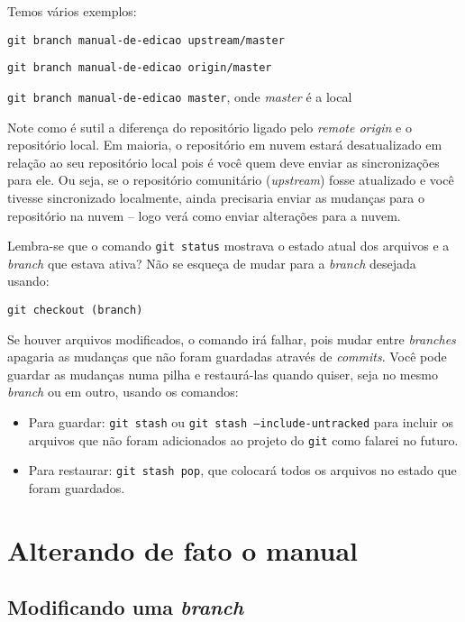 \documentclass[a4paper,oneside,10pt]{memoir}
\begin{document}
Temos vários exemplos:

\begin{center}
\texttt{git branch manual-de-edicao upstream/master}

\texttt{git branch manual-de-edicao origin/master}

\texttt{git branch manual-de-edicao master}, onde \emph{master} é a local
\end{center}

Note como é sutil a diferença do repositório ligado pelo \emph{remote origin} e
o repositório local. Em maioria, o repositório em nuvem estará desatualizado em
relação ao seu repositório local pois é você quem deve enviar as sincronizações
para ele. Ou seja, se o repositório comunitário (\emph{upstream}) fosse
atualizado e você tivesse sincronizado localmente, ainda precisaria enviar as
mudanças para o repositório na nuvem -- logo verá como enviar alterações para
a nuvem.

Lembra-se que o comando \texttt{git status} mostrava o estado atual dos
arquivos e a \emph{branch} que estava ativa? Não se esqueça de mudar para a
\emph{branch} desejada usando:

\begin{center}
\texttt{git checkout (branch)}
\end{center}

Se houver arquivos modificados, o comando irá falhar, pois mudar entre
\emph{branches} apagaria as mudanças que não foram guardadas através de
\emph{commits}. Você pode guardar as mudanças numa pilha e restaurá-las quando
quiser, seja no mesmo \emph{branch} ou em outro, usando os comandos:

\begin{itemize}
\item Para guardar: \texttt{git stash} ou \texttt{git stash
  --include-untracked} para incluir os arquivos que não foram adicionados ao
  projeto do \texttt{git} como falarei no futuro.
\item Para restaurar: \texttt{git stash pop}, que colocará todos os arquivos
  no estado que foram guardados.
\end{itemize}

\section{Alterando de fato o manual}

\subsection{Modificando uma \emph{branch}}
\end{document}
